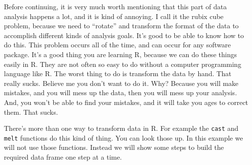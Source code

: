 \documentclass[]{book}
\begin{document}
Before continuing, it is very much worth mentioning that this part of
data analysis happens a lot, and it is kind of annoying. I call it the
rubix cube problem, because we need to ``rotate'' and transform the
format of the data to accomplish different kinds of analysis goals. It's
good to be able to know how to do this. This problem occurs all of the
time, and can occur for any software package. It's a good thing you are
learning R, because we can do these things easily in R. They are not
often so easy to do without a computer programming language like R. The
worst thing to do is transform the data by hand. That really sucks.
Believe me you don't want to do it. Why? Because you will make mistakes,
and you will mess up the data, then you will mess up your analysis. And,
you won't be able to find your mistakes, and it will take you ages to
correct them. That sucks.

There's more than one way to transform data in R. For example the
\texttt{cast} and \texttt{melt} functions do this kind of thing. You can
look those up. In this example we will not use those functions. Instead
we will show some steps to build the required data frame one step at a
time.
\end{document}
